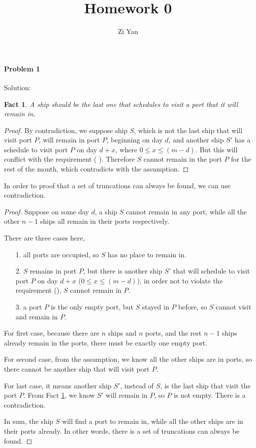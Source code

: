 \documentclass[12pt,letterpaper]{article}
\author{Zi Yan}
\title{Homework 0}
\begin{document}
\maketitle

\paragraph*{Problem 1}
Solution: 

\newtheorem{fact1}{Fact}

\begin{fact1}\label{fact}
A ship should be the last one that schedules to visit a port that it 
will remain in.
\end{fact1}

\begin{proof}
By contradiction, we suppose ship $S$, which is not the last ship that
will visit port $P$, will remain in port $P$, beginning on day $d$, and 
another ship $S'$  has a schedule to visit port $P$ on day $d+x$, where 
$0 \le x \le (m - d)$. But this will conflict with the requirement (
\textdagger). Therefore $S$ cannot remain in the port $P$ for the rest
of the month, which contradicts with the assumption. 
\end{proof}

In order to proof that a set of truncations can always be found, we can
use contradiction.

\begin{proof}
Suppose on some day $d$, a ship $S$ cannot remain in any port, while
all the other $n-1$ ships all remain in their ports respectively.

There are three cases here, 
\begin{itemize}
    \item[1.] all ports are occupied, so $S$ has no place to remain in.
    \item[2.] $S$ remains in port $P$, but there is another ship $S'$ that 
    will schedule to visit port $P$ on day $d+x$ ($0 \le x \le (m - d)$), 
    in order not to violate the requirement (\textdagger), $S$ cannot 
    remain in $P$.
    \item[3.] a port $P$ is the only empty port, but $S$ stayed in $P$ before, 
    so $S$ cannot visit and remain in $P$.
\end{itemize}

For first case, because there are $n$ ships and $n$ ports, and the rest $n-1$
ships already remain in the ports, there must be exactly one empty port.

For second case, from the assumption, we know all the other ships are in ports,
so there cannot be another ship that will visit port $P$.

For last case, it means another ship $S'$, instead of $S$, is the last ship that
visit the port $P$. From Fact \ref{fact}, we know $S'$ will remain in $P$, so
$P$ is not empty. There is a contradiction.

In sum, the ship $S$ will find a port to remain in, while all the other ships 
are in their ports already. In other words, there is a set of truncations can 
always be found.
\end{proof}
\end{document}
